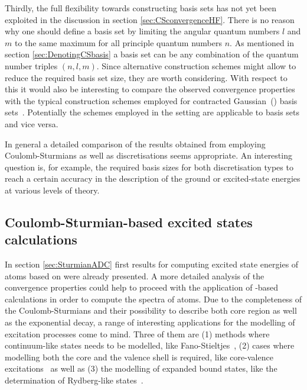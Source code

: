 Thirdly, the full flexibility towards constructing \CS basis sets has not yet
been exploited in the discussion in section \vref{sec:CSconvergenceHF}.
There is no reason why one should define a basis set
by limiting the angular quantum numbers $l$ and $m$ to the same maximum for all
principle quantum numbers $n$.
As mentioned in section \vref{sec:DenotingCSbasis} a \CS basis set can be any
combination of the quantum number triples $(n, l, m)$.
Since alternative construction schemes might allow to reduce
the required basis set size,
they are worth considering.
With respect to this it would also be interesting to compare the
observed convergence properties with the typical construction schemes
employed for contracted Gaussian~(\cGTO) basis sets~\cite{Jensen2013,Hill2013}.
Potentially the schemes employed in the \cGTO setting are applicable
to \CS basis sets and vice versa.

In general a detailed comparison of the results obtained
from employing Coulomb-Sturmians as well as \cGTO discretisations seems appropriate.
An interesting question is, for example, the required basis sizes for both
discretisation types to reach a certain accuracy
in the description of the ground or excited-state energies
at various levels of theory.

\subsection{Coulomb-Sturmian-based excited states calculations}
\label{sec:SturmianExcited}
In section \vref{sec:SturmianADC} first results
for computing excited state energies of atoms based on \ADC
were already presented.
A more detailed analysis of the convergence properties
could help to proceed with the application of \CS-based \ADC
calculations in order to compute the spectra of atoms.
Due to the completeness of the Coulomb-Sturmians
and their possibility to describe both core region as well as
the exponential decay,
a range of interesting applications for the modelling
of excitation processes come to mind.
Three of them are
(1) methods where continuum-like states needs to be modelled,
like Fano-Stieltjes~\cite{Feshbach1958,Feshbach1962,Santra2002},
(2) cases where modelling both the core and the valence shell is required,
like core-valence excitations~\cite{Wenzel2014,Wenzel2016}
as well as
(3) the modelling of expanded bound states,
like the determination of Rydberg-like states~\cite{Kaufmann1989,Riss1993}.

